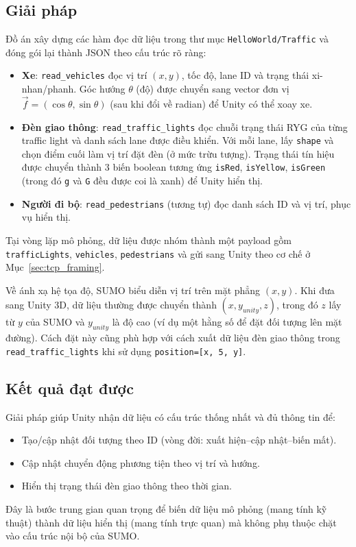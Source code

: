 \documentclass[../DoAn.tex]{subfiles}
\begin{document}
\subsection{Giải pháp}
Đồ án xây dựng các hàm đọc dữ liệu trong thư mục \texttt{HelloWorld/Traffic} và đóng gói lại thành JSON theo cấu trúc rõ ràng:
\begin{itemize}[leftmargin=2em]
	\item \textbf{Xe}: \texttt{read\_vehicles} đọc vị trí $(x, y)$, tốc độ, lane ID và trạng thái xi-nhan/phanh. Góc hướng $\theta$ (độ) được chuyển sang vector đơn vị $\vec{f} = (\cos\theta, \sin\theta)$ (sau khi đổi về radian) để Unity có thể xoay xe.
	\item \textbf{Đèn giao thông}: \texttt{read\_traffic\_lights} đọc chuỗi trạng thái RYG của từng traffic light và danh sách lane được điều khiển. Với mỗi lane, lấy \texttt{shape} và chọn điểm cuối làm vị trí đặt đèn (ở mức trừu tượng). Trạng thái tín hiệu được chuyển thành 3 biến boolean tương ứng \texttt{isRed}, \texttt{isYellow}, \texttt{isGreen} (trong đó \texttt{g} và \texttt{G} đều được coi là xanh) để Unity hiển thị.
	\item \textbf{Người đi bộ}: \texttt{read\_pedestrians} (tương tự) đọc danh sách ID và vị trí, phục vụ hiển thị.
\end{itemize}
Tại vòng lặp mô phỏng, dữ liệu được nhóm thành một payload gồm \texttt{trafficLights}, \texttt{vehicles}, \texttt{pedestrians} và gửi sang Unity theo cơ chế ở Mục~\ref{sec:tcp_framing}.

Về ánh xạ hệ tọa độ, SUMO biểu diễn vị trí trên mặt phẳng $(x, y)$. Khi đưa sang Unity 3D, dữ liệu thường được chuyển thành $(x, y_{unity}, z)$, trong đó $z$ lấy từ $y$ của SUMO và $y_{unity}$ là độ cao (ví dụ một hằng số để đặt đối tượng lên mặt đường). Cách đặt này cũng phù hợp với cách xuất dữ liệu đèn giao thông trong \texttt{read\_traffic\_lights} khi sử dụng \texttt{position=[x, 5, y]}.

\subsection{Kết quả đạt được}
Giải pháp giúp Unity nhận dữ liệu có cấu trúc thống nhất và đủ thông tin để:
\begin{itemize}[leftmargin=2em]
	\item Tạo/cập nhật đối tượng theo ID (vòng đời: xuất hiện--cập nhật--biến mất).
	\item Cập nhật chuyển động phương tiện theo vị trí và hướng.
	\item Hiển thị trạng thái đèn giao thông theo thời gian.
\end{itemize}
Đây là bước trung gian quan trọng để biến dữ liệu mô phỏng (mang tính kỹ thuật) thành dữ liệu hiển thị (mang tính trực quan) mà không phụ thuộc chặt vào cấu trúc nội bộ của SUMO.
\end{document}
